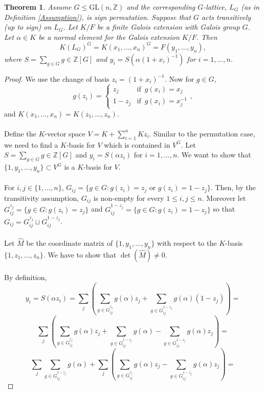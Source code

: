 \documentclass[12pt]{article}
\theoremstyle{plain}
\newtheorem{theorem}{Theorem}
\newcommand{\Z}{\ensuremath{\mathbb{Z}}}
\begin{document}
\begin{theorem}\label{nonamesign}
Assume $G \leq \mathrm{GL}(n,\Z)$ and the corresponding $G$-lattice, $L_G$ (as in Definition \ref{Assumption}), is sign permutation. Suppose that $G$ acts transitively (up to sign) on $L_G$. Let $K/F$ be a finite Galois extension with Galois group $G$. Let $\alpha \in K$ be a normal element for the Galois extension $K/F$. Then 
$$K(L_G)^G = K(x_1,\ldots, x_n)^G = F(y_1, \ldots, y_{n}),$$ 
where $S = \sum_{g \in G} g \in \Z[G]$ and $y_i = S(\alpha (1+x_i)^{-1})$ for $ i = 1, \ldots, n$.
\end{theorem}
\begin{proof}
We use the change of basis $z_i = (1+x_i)^{-1} $. Now for $g \in G$, $$g(z_i) = \begin{cases} z_j  & \text{if} \,\,\, g(x_i) = x_j \\
1-z_j & \text{if} \,\,\, g(x_i) = x_j^{-1}
\end{cases},$$ 
 and $K(x_1, \ldots , x_n) = K(z_1, \ldots, z_n).$\\
 \\
Define the $K$-vector space $V= K + \sum^n_{i=1}Kz_i$. Similar to the permutation case, we need to find a $K$-basis for $V$ which is contained in $V^G$. Let $S = \sum_{g \in G} g \in \Z[G]$ and $y_i = S(\alpha z_i)$ for $ i = 1, \ldots, n$. We want to show that $\lbrace 1, y_1, \ldots	, y_n \rbrace \subset V^G$ is a $K$-basis for $V$.\\
\\
For $i,j \in \lbrace 1, \ldots , n \rbrace$, $G_{ij} = \lbrace g \in G : g(z_i) = z_j \,\, \text{or} \,\, g(z_i) = 1-z_j \rbrace $. Then, by the transitivity assumption, $G_{ij}$ is non-empty for every $1 \leq i,j \leq n$. Moreover let $G^{z_j}_{ij} = \lbrace g \in G : g(z_i) = z_j \rbrace$ and $G^{1-z_j}_{ij} = \lbrace g \in G : g(z_i) = 1- z_j \rbrace$ so that $G_{ij}= G^{z_j}_{ij}\sqcup G^{1-z_j}_{ij}$.
\\
\\
Let $\hat{M}$ be the coordinate matrix of $\lbrace 1, y_1, \ldots	, y_n \rbrace$ with respect to the $K$-basis $\lbrace 1, z_1, \ldots , z_n \rbrace$. We have to show that  $\det (\hat{M}) \neq 0$. \\
\\
By definition, 
$$y_i = S(\alpha z_i) = \sum_{j}(\sum_{g\in G^{z_j}_{ij}}g(\alpha)z_j +\sum_{g\in G^{1-z_j}_{ij}}g(\alpha)(1-z_j)) =$$ 
$$ \sum_{j}(\sum_{g\in G^{z_j}_{ij}}g(\alpha)z_j +\sum_{g\in G^{1-z_j}_{ij}}g(\alpha)-\sum_{g\in G^{1-z_j}_{ij}}g(\alpha)z_j) = $$ 
$$\sum_{j}\sum_{g\in G^{1-z_j}_{ij}}g(\alpha)+ \sum_{j}(\sum_{g\in G^{z_j}_{ij}}g(\alpha)z_j -\sum_{g\in G^{1-z_j}_{ij}}g(\alpha)z_j) =$$

\end{proof}
\end{document}
